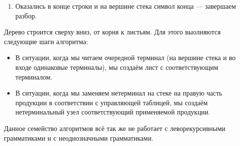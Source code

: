 \begin{example}
\begin{enumerate}
    \begin{center}
  \end{center}

\item Оказались в конце строки и на вершине стека символ конца --- завершаем разбор.

\end{enumerate}

\end{example}

Дерево строится сверху вниз, от корня к листьям. Для этого выолняются следующие шаги алгоритма:
\begin{itemize}
  \item В ситуации, когда мы читаем очередной терминал (на вершине стека и во входе одинаковые терминалы), мы создаём лист с соответствующим терминалом.
  \item В ситуации, когда мы заменяем нетерминал на стеке на правую часть продукции в соответствии с управляющей таблицей, мы создаём нетерминальный узел соответствующий применяемой продукции.
\end{itemize}

Данное семейство алгоритмов всё так же не работает с леворекурсивными грамматиками и с неоднозначными грамматиками.

